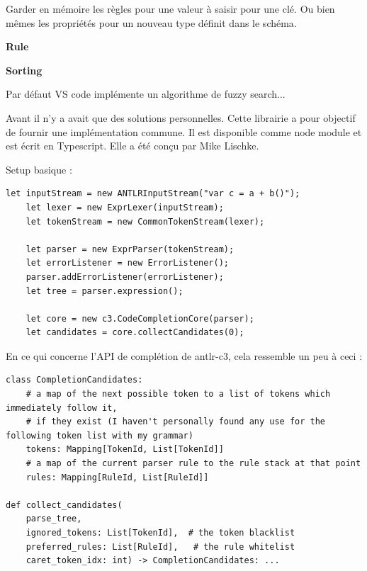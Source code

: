 \documentclass[
    iict, %
    il, %
]{heig-tb}
\begin{document}
Garder en mémoire les règles pour une valeur à saisir pour une clé.
Ou bien mêmes les propriétés pour un nouveau type définit dans le schéma.


\textbf{Rule}


\textbf{Sorting}

Par défaut VS code implémente un algorithme de fuzzy search...

Avant il n'y a avait que des solutions personnelles. Cette librairie a pour objectif de fournir une implémentation commune. Il est disponible comme node module et est écrit en Typescript.
Elle a été conçu par Mike Lischke.

Setup basique :

\begin{lstlisting}[frame=single,caption={antlr-setup},label={antlr-setup}]
    let inputStream = new ANTLRInputStream("var c = a + b()");
    let lexer = new ExprLexer(inputStream);
    let tokenStream = new CommonTokenStream(lexer);

    let parser = new ExprParser(tokenStream);
    let errorListener = new ErrorListener();
    parser.addErrorListener(errorListener);
    let tree = parser.expression();

    let core = new c3.CodeCompletionCore(parser);
    let candidates = core.collectCandidates(0);
\end{lstlisting}

En ce qui concerne l'API de complétion de antlr-c3, cela ressemble un peu à ceci :

\begin{lstlisting}[frame=single]
class CompletionCandidates:
    # a map of the next possible token to a list of tokens which immediately follow it,
    # if they exist (I haven't personally found any use for the following token list with my grammar)
    tokens: Mapping[TokenId, List[TokenId]]
    # a map of the current parser rule to the rule stack at that point
    rules: Mapping[RuleId, List[RuleId]]

def collect_candidates(
    parse_tree,
    ignored_tokens: List[TokenId],  # the token blacklist
    preferred_rules: List[RuleId],   # the rule whitelist
    caret_token_idx: int) -> CompletionCandidates: ...
\end{lstlisting}


\end{document}
